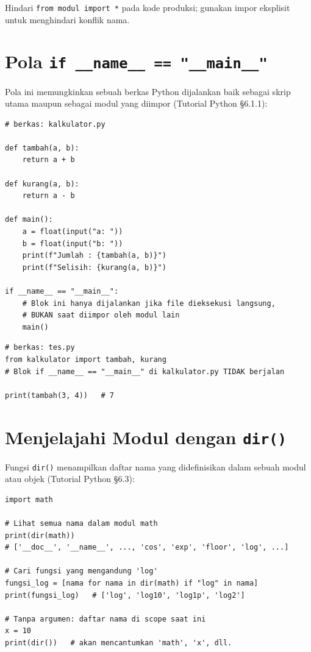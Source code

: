 \documentclass[../main.tex]{subfiles}
\begin{document}
Hindari \texttt{from modul import *} pada kode produksi; gunakan impor eksplisit untuk menghindari konflik nama.

\section{Pola \texttt{if \_\_name\_\_ == "\_\_main\_\_"}}

Pola ini memungkinkan sebuah berkas Python dijalankan baik sebagai skrip utama maupun sebagai modul yang diimpor (Tutorial Python §6.1.1):

\begin{lstlisting}[caption=Pola if \textunderscore\textunderscore name\textunderscore\textunderscore == main]
# berkas: kalkulator.py

def tambah(a, b):
    return a + b

def kurang(a, b):
    return a - b

def main():
    a = float(input("a: "))
    b = float(input("b: "))
    print(f"Jumlah : {tambah(a, b)}")
    print(f"Selisih: {kurang(a, b)}")

if __name__ == "__main__":
    # Blok ini hanya dijalankan jika file dieksekusi langsung,
    # BUKAN saat diimpor oleh modul lain
    main()
\end{lstlisting}

\begin{lstlisting}[caption=Mengimpor fungsi dari berkas lain menggunakan modul]
# berkas: tes.py
from kalkulator import tambah, kurang
# Blok if __name__ == "__main__" di kalkulator.py TIDAK berjalan

print(tambah(3, 4))   # 7
\end{lstlisting}

\section{Menjelajahi Modul dengan \texttt{dir()}}

Fungsi \texttt{dir()} menampilkan daftar nama yang didefinisikan dalam sebuah modul atau objek (Tutorial Python §6.3):

\begin{lstlisting}[caption=Menjelajahi modul dengan dir()]
import math

# Lihat semua nama dalam modul math
print(dir(math))
# ['__doc__', '__name__', ..., 'cos', 'exp', 'floor', 'log', ...]

# Cari fungsi yang mengandung 'log'
fungsi_log = [nama for nama in dir(math) if "log" in nama]
print(fungsi_log)   # ['log', 'log10', 'log1p', 'log2']

# Tanpa argumen: daftar nama di scope saat ini
x = 10
print(dir())   # akan mencantumkan 'math', 'x', dll.
\end{lstlisting}
\end{document}
